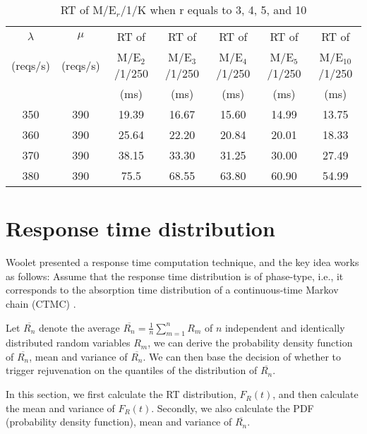 \documentclass[10pt,journal,letterpaper,compsoc]{IEEEtran}
\begin{document}
\begin{table*}
\renewcommand{\arraystretch}{1.3}
\caption{RT of M/E$_r$/1/K when r equals to 3, 4, 5, and 10}
\label{table:tabr}
\centering
\begin{tabular}{ c c c c c c c }
\hline
$\lambda$     & $\mu$     & RT of         & RT of             & RT of         & RT of         & RT of     \\
(reqs/s)      & (reqs/s)  & M/E$_2$/1/250 & M/E$_3$/1/250     & M/E$_4$/1/250 & M/E$_5$/1/250 & M/E$_{10}$/1/250 \\
              &           & (ms)          & (ms)              & (ms)          & (ms)          & (ms)      \\
\hline                                                                                                   
350           & 390       & 19.39         & 16.67           & 15.60         & 14.99         & 13.75        \\
360           & 390       & 25.64         & 22.20           & 20.84         & 20.01         & 18.33        \\
370           & 390       & 38.15         & 33.30           & 31.25         & 30.00         & 27.49        \\
380           & 390       & 75.5          & 68.55          & 63.80          & 60.90          & 54.99        \\
\hline
\end{tabular}
\end{table*}

\section{Response time distribution} %
\label{sec:responseTimeDist}
Woolet presented a response time computation technique,
and the key idea works as follows:
Assume that the response time distribution is of phase-type, i.e.,
it corresponds to the absorption time distribution of
a continuous-time Markov chain (CTMC) \cite{ChScience:SPWoolet1993PHD}.

Let $\overline{R_n}$ denote the average
$\overline{R_n}=\frac{1}{n}\sum_{m=1}^nR_m$ of $n$ independent
and identically distributed random variables $R_m$,
we can derive the probability density function of $\overline{R_n}$,
mean and variance of $\overline{R_n}$.
We can then base the decision of whether to trigger rejuvenation on
the quantiles of the distribution of $\overline{R_n}$.

In this section,
we first calculate the RT distribution, $F_R(t)$,
and then calculate the mean and variance of $F_R(t)$.
Secondly, we also calculate the PDF (probability density function),
mean and variance of $\overline{R_n}$.
\end{document}
